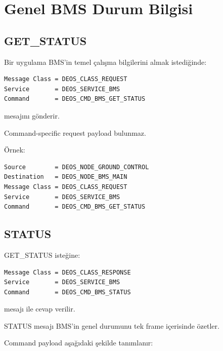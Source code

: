 \documentclass[a4paper,10pt]{article}
\begin{document}
\section{Genel BMS Durum Bilgisi}

\subsection{GET\_STATUS}

Bir uygulama BMS'in temel çalışma bilgilerini almak istediğinde:

\begin{lstlisting}
Message Class = DEOS_CLASS_REQUEST
Service       = DEOS_SERVICE_BMS
Command       = DEOS_CMD_BMS_GET_STATUS
\end{lstlisting}

mesajını gönderir.

Command-specific request payload bulunmaz.

Örnek:

\begin{lstlisting}
Source        = DEOS_NODE_GROUND_CONTROL
Destination   = DEOS_NODE_BMS_MAIN
Message Class = DEOS_CLASS_REQUEST
Service       = DEOS_SERVICE_BMS
Command       = DEOS_CMD_BMS_GET_STATUS
\end{lstlisting}

\subsection{STATUS}

GET\_STATUS isteğine:

\begin{lstlisting}
Message Class = DEOS_CLASS_RESPONSE
Service       = DEOS_SERVICE_BMS
Command       = DEOS_CMD_BMS_STATUS
\end{lstlisting}

mesajı ile cevap verilir.

STATUS mesajı BMS'in genel durumunu tek frame içerisinde özetler.

Command payload aşağıdaki şekilde tanımlanır:
\end{document}
